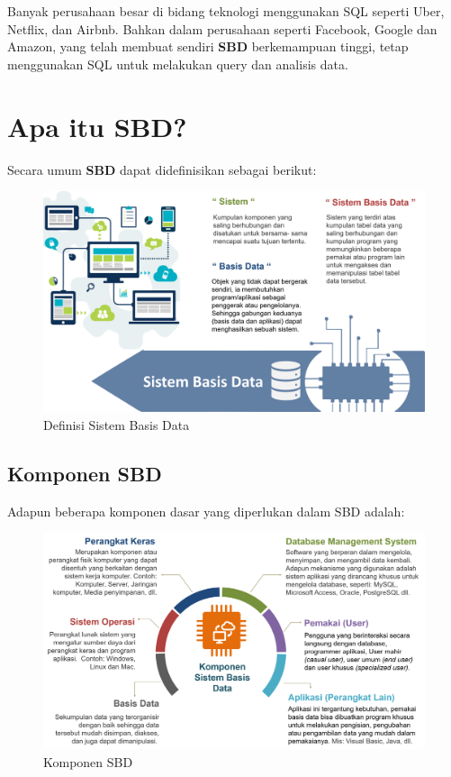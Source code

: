 \documentclass[
]{book}
\begin{document}
Banyak perusahaan besar di bidang teknologi menggunakan SQL seperti Uber, Netflix, dan Airbnb. Bahkan dalam perusahaan seperti Facebook, Google dan Amazon, yang telah membuat sendiri \textbf{SBD} berkemampuan tinggi, tetap menggunakan SQL untuk melakukan query dan analisis data.

\hypertarget{apa-itu-sbd}{%
\section{Apa itu SBD?}\label{apa-itu-sbd}}

Secara umum \textbf{SBD} dapat didefinisikan sebagai berikut:

\begin{figure}

{\centering \includegraphics[width=1\linewidth]{./images/Bab1/definisi_DB} 

}

\caption{Definisi Sistem Basis Data}\label{fig:SBD}
\end{figure}

\hypertarget{komponen-sbd}{%
\subsection{Komponen SBD}\label{komponen-sbd}}

Adapun beberapa komponen dasar yang diperlukan dalam SBD adalah:

\begin{figure}

{\centering \includegraphics[width=1\linewidth]{./images/Bab1/komponen_DB} 

}

\caption{Komponen SBD}\label{fig:komponen}
\end{figure}
\end{document}
